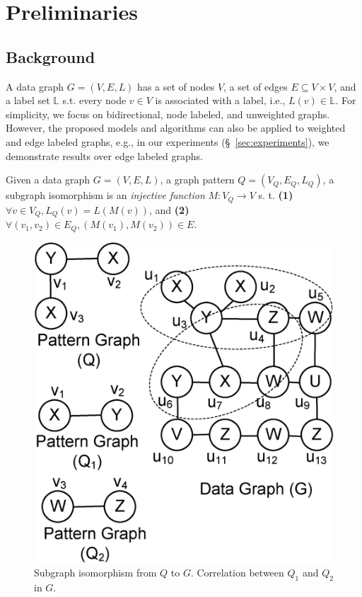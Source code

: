 \section{Preliminaries}
\label{sec:preliminaries}
%
\subsection{Background}
\label{sec:background}
%
A data graph $G = (V,E,L)$ has a set of nodes $V$, a set of edges
$E \subseteq V \times V$, and a label set $\mathbb{L}$ s.t.
every node $v \in V$ is associated with a label, i.e., $L(v) \in \mathbb{L}$.
For simplicity, we focus on bidirectional, node labeled, and unweighted
graphs. However, the proposed models and algorithms can also be applied to weighted
and edge labeled graphs, e.g., in our experiments (\S~\ref{sec:experiments}), we demonstrate results over
edge labeled graphs.

 Given a data graph $G=(V,E,L)$, a graph pattern
$Q=(V_Q,E_Q,L_Q)$, a subgraph isomorphism is an {\em injective function} $M: V_Q \rightarrow V$ s. t.
{\bf (1)} $\forall v\in V_Q, L_Q(v)= L(M(v))$, and {\bf (2)} $\forall(v_1,v_2) \in E_Q, (M(v_1),M(v_2))\in E$.
%
\begin{figure}[t!]
\centering
\vspace{-1\baselineskip}
\includegraphics[scale=0.23]{images/correlation}
\caption{Subgraph isomorphism from $Q$ to $G$. Correlation between $Q_1$ and $Q_2$ in $G$.}
\label{fig:subgraph_isomorphism}
\vspace{-0.1\baselineskip}
\end{figure}

